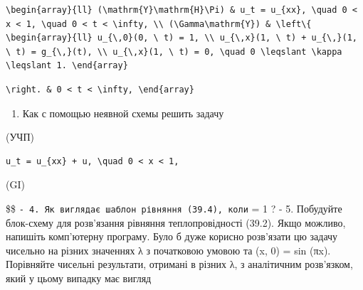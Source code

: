 \documentclass[
  ukrainian,
]{article}
\providecommand{\tightlist}{%
  \setlength{\itemsep}{0pt}\setlength{\parskip}{0pt}}
\begin{document}
\begin{verbatim}
\begin{array}{ll} (\mathrm{Y}\mathrm{H}\Pi) & u_t = u_{xx}, \quad 0 < x < 1, \quad 0 < t < \infty, \\ (\Gamma\mathrm{Y}) & \left\{ \begin{array}{ll} u_{\,0}(0, \ t) = 1, \\ u_{\,x}(1, \ t) + u_{\,}(1, \ t) = g_{\,}(t), \\ u_{\,x}(1, \ t) = 0, \quad 0 \leqslant \kappa \leqslant 1. \end{array}
\end{verbatim}

\begin{verbatim}
\right. & 0 < t < \infty, \end{array}
\end{verbatim}

\begin{enumerate}
\def\labelenumi{\arabic{enumi}.}
\setcounter{enumi}{2}
\tightlist
\item
  Как с помощью неявной схемы решить задачу
\end{enumerate}

(УЧП)

\begin{verbatim}
u_t = u_{xx} + u, \quad 0 < x < 1,
\end{verbatim}

(GI)

\$\$ \texttt{-\ 4.\ Як\ виглядає\ шаблон\ рівняння\ (39.4),\ коли}
\lambda = 1 ? - 5. Побудуйте блок-схему для розв'язання рівняння
теплопровідності (39.2). Якщо можливо, напишіть комп'ютерну програму.
Було б дуже корисно розв'язати цю задачу чисельно на різних значеннях λ
з початковою умовою та (x, 0) = sin (πx). Порівняйте чисельні
результати, отримані в різних λ, з аналітичним розв'язком, який у цьому
випадку має вигляд
\end{document}
